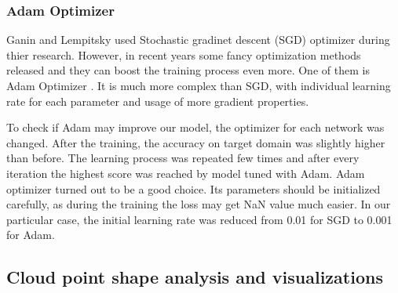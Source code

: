 \documentclass{article}
\begin{document}
\subsubsection{Adam Optimizer}
Ganin and Lempitsky used Stochastic gradinet descent (SGD) optimizer during thier research. However, in recent years some fancy optimization methods released and they can boost the training process even more. One of them is Adam Optimizer \cite{adam}. It is much more complex than SGD, with individual learning rate for each parameter and usage of more gradient properties. 
\par
To check if Adam may improve our model, the optimizer for each network was changed. After the training, the accuracy on target domain was slightly higher than before. The learning process was repeated few times and after every iteration the highest score was reached by model tuned with Adam. Adam optimizer turned out to be a good choice. Its parameters should be initialized carefully, as during the training the loss may get NaN value much easier. In our particular case, the initial learning rate was reduced from 0.01 for SGD to 0.001 for Adam.

\subsection{Cloud point shape analysis and visualizations}
\end{document}

